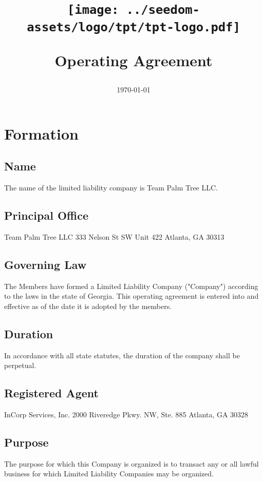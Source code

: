 \documentclass[11pt]{article}
\begin{document}
\title{%
\begin{center}
\texttt{[image: ../seedom-assets/logo/tpt/tpt-logo.pdf]}
\end{center}
\huge Operating Agreement \\[1mm]}
\date{\today}
\maketitle
\pagebreak

\tableofcontents
\pagebreak

\section{Formation}

\subsection{Name}
The name of the limited liability company is Team Palm Tree LLC.

\subsection{Principal Office}
Team Palm Tree LLC
333 Nelson St SW
Unit 422
Atlanta, GA 30313

\subsection{Governing Law}
The Members have formed a Limited Liability Company ("Company") according to the laws in the state of Georgia. This operating agreement is entered into and effective as of the date it is adopted by the members.

\subsection{Duration}
In accordance with all state statutes, the duration of the company shall be perpetual.

\subsection{Registered Agent}
InCorp Services, Inc.
2000 Riveredge Pkwy. NW, Ste. 885
Atlanta, GA 30328

\subsection{Purpose}
The purpose for which this Company is organized is to transact any or all lawful business for which Limited Liability Companies may be organized.
\end{document}

